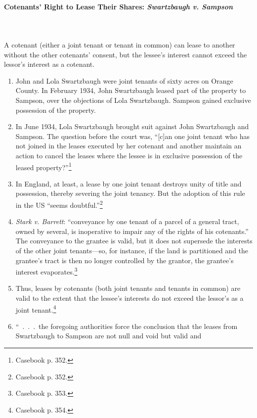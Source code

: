 \paragraph{Cotenants' Right to Lease Their Shares: \emph{Swartzbaugh v. 
Sampson}}
~\\\\
A cotenant (either a joint tenant or tenant in common)  can lease to another 
without the other cotenants' consent, but the lessee's interest cannot exceed 
the lessor's interest as a cotenant.

\begin{enumerate}
    \item John and Lola Swartzbaugh were joint tenants of sixty acres on 
    Orange County. In February 1934, John Swartzbaugh leased part of the 
    property to Sampson, over the objections of Lola Swartzbaugh. Sampson 
    gained exclusive possession of the property.
    \item In June 1934, Lola Swartzbaugh brought suit against John Swartzbaugh 
    and Sampson. The question before the court was, ``[c]an one joint tenant 
    who has not joined in the leases executed by her cotenant and another 
    maintain an action to cancel the leases where the lessee is in exclusive 
    possession of the leased property?''\footnote{Casebook p. 352.}
    \item In England, at least, a lease by one joint tenant destroys unity of 
    title and possession, thereby severing the joint tenancy. But the adoption 
    of this rule in the US ``seems doubtful.''\footnote{Casebook p. 352.}
    \item \emph{Stark v. Barrett}: ``conveyance by one tenant of a parcel of a 
    general tract, owned by several, is inoperative to impair any of the 
    rights of his cotenants.'' The conveyance to the grantee is valid, but it 
    does not supersede the interests of the other joint tenants---so, for 
    instance, if the land is partitioned and the grantee's tract is then no 
    longer controlled by the grantor, the grantee's interest 
    evaporates.\footnote{Casebook p. 353.}
    \item Thus, leases by cotenants (both joint tenants and tenants in 
    common) are valid to the extent that the lessee's interests do not exceed 
    the lessor's as a joint tenant.\footnote{Casebook p. 354.}
    \item ``~.~.~.~the foregoing authorities force the conclusion that the 
    leases from Swartzbaugh to Sampson are not null and void but valid and 

\end{enumerate}
